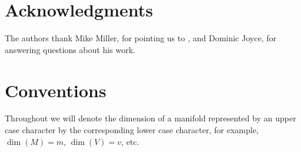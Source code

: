 \section*{Acknowledgments}

The authors thank Mike Miller, for pointing us to \cite{Lipy14}, and Dominic Joyce, for answering questions about his work.

\section*{Conventions}

Throughout we will denote the dimension of a manifold represented by an upper case character by the corresponding lower case character, for example, $\dim(M)=m$, $\dim(V)=v$, etc.
